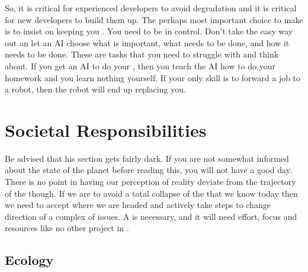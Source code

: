 So, it is critical for experienced developers to avoid  degradation and it is critical for new developers to build them up. The perhaps most important choice to make is to insist on keeping you . You need to be in control. Don't take the easy way out an let an AI choose what is important, what needs to be done, and how it needs to be done. These are tasks that you need to struggle with and think about. If you get an AI to do your , then you teach the AI how to do your homework and you learn nothing yourself. If your only skill is to forward a job to a robot, then the robot will end up replacing you. %

\section{Societal Responsibilities}

Be advised that his section gets fairly dark. If you are not somewhat informed about the state of the planet before reading this, you will not have a good day. There is no point in having our perception of reality deviate from the trajectory of the  though. If we are to avoid a total collapse of the  that we know today then we need to accept where we are headed and actively take steps to change direction of a complex of issues. A  is necessary, and it will need effort, focus and resources like no other project in .

\subsection{Ecology}

